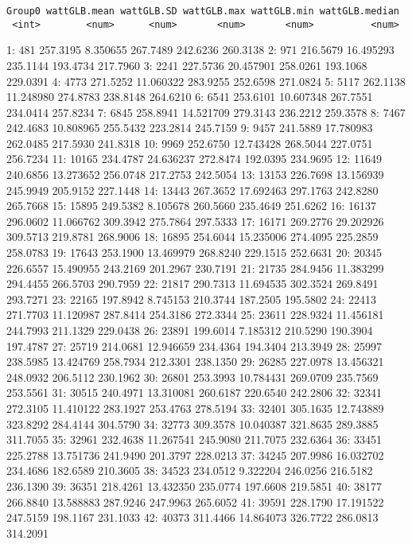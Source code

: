 \documentclass[
  10pt,
  a4paper,oneside]{article}
\begin{document}
\begin{verbatim}
Group0 wattGLB.mean wattGLB.SD wattGLB.max wattGLB.min wattGLB.median
 <int>        <num>      <num>       <num>       <num>          <num>
\end{verbatim}

1: 481 257.3195 8.350655 267.7489 242.6236 260.3138
2: 971 216.5679 16.495293 235.1144 193.4734 217.7960
3: 2241 227.5736 20.457901 258.0261 193.1068 229.0391
4: 4773 271.5252 11.060322 283.9255 252.6598 271.0824
5: 5117 262.1138 11.248980 274.8783 238.8148 264.6210
6: 6541 253.6101 10.607348 267.7551 234.0414 257.8234
7: 6845 258.8941 14.521709 279.3143 236.2212 259.3578
8: 7467 242.4683 10.808965 255.5432 223.2814 245.7159
9: 9457 241.5889 17.780983 262.0485 217.5930 241.8318
10: 9969 252.6750 12.743428 268.5044 227.0751 256.7234
11: 10165 234.4787 24.636237 272.8474 192.0395 234.9695
12: 11649 240.6856 13.273652 256.0748 217.2753 242.5054
13: 13153 226.7698 13.156939 245.9949 205.9152 227.1448
14: 13443 267.3652 17.692463 297.1763 242.8280 265.7668
15: 15895 249.5382 8.105678 260.5660 235.4649 251.6262
16: 16137 296.0602 11.066762 309.3942 275.7864 297.5333
17: 16171 269.2776 29.202926 309.5713 219.8781 268.9006
18: 16895 254.6044 15.235006 274.4095 225.2859 258.0783
19: 17643 253.1900 13.469979 268.8240 229.1515 252.6631
20: 20345 226.6557 15.490955 243.2169 201.2967 230.7191
21: 21735 284.9456 11.383299 294.4455 266.5703 290.7959
22: 21817 290.7313 11.694535 302.3524 269.8491 293.7271
23: 22165 197.8942 8.745153 210.3744 187.2505 195.5802
24: 22413 271.7703 11.120987 287.8414 254.3186 272.3344
25: 23611 228.9324 11.456181 244.7993 211.1329 229.0438
26: 23891 199.6014 7.185312 210.5290 190.3904 197.4787
27: 25719 214.0681 12.946659 234.4364 194.3404 213.3949
28: 25997 238.5985 13.424769 258.7934 212.3301 238.1350
29: 26285 227.0978 13.456321 248.0932 206.5112 230.1962
30: 26801 253.3993 10.784431 269.0709 235.7569 253.5561
31: 30515 240.4971 13.310081 260.6187 220.6540 242.2806
32: 32341 272.3105 11.410122 283.1927 253.4763 278.5194
33: 32401 305.1635 12.743889 323.8292 284.4144 304.5790
34: 32773 309.3578 10.040387 321.8635 289.3885 311.7055
35: 32961 232.4638 11.267541 245.9080 211.7075 232.6364
36: 33451 225.2788 13.751736 241.9490 201.3797 228.0213
37: 34245 207.9986 16.032702 234.4686 182.6589 210.3605
38: 34523 234.0512 9.322204 246.0256 216.5182 236.1390
39: 36351 218.4261 13.432350 235.0774 197.6608 219.5851
40: 38177 266.8840 13.588883 287.9246 247.9963 265.6052
41: 39591 228.1790 17.191522 247.5159 198.1167 231.1033
42: 40373 311.4466 14.864073 326.7722 286.0813 314.2091
\end{document}
